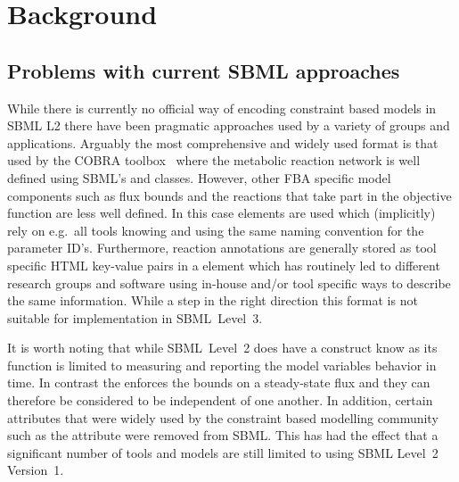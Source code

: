 
\section{Background}
\label{background}

\subsection{Problems with current SBML approaches}

While there is currently no official way of encoding constraint based models
in SBML L2 there have been pragmatic approaches used by a variety of groups
and applications. Arguably the most comprehensive and widely used format is
that used by the \textsf{COBRA toolbox}~\citep{cobra} where the metabolic
reaction network is well defined using SBML's \Reaction and \Species
classes. However, other FBA specific model components such as flux bounds
and the reactions that take part in the objective function are less well
defined. In this case \LocalParameter elements are used which (implicitly)
rely on e.g.~all tools knowing and using the same naming convention for the
parameter ID's. Furthermore, reaction annotations are generally stored as
tool specific HTML key-value pairs in a \Notes element which has routinely
led to different research groups and software using in-house and/or tool
specific ways to describe the same information. While a step in the right
direction this format is not suitable for implementation in SBML~Level~3.

It is worth noting that while SBML~Level~2 does have a construct know as
\Constraint its function is limited to measuring and reporting the model
variables behavior in time. In contrast the \FluxBound enforces the bounds
on a steady-state flux and they can therefore be considered to be
independent of one another.
%
In addition, certain attributes that were widely used by the constraint based
modelling community such as the \Species attribute  were
removed from SBML. This has had the effect that a significant number of
tools and models are still limited to using SBML Level~2 Version~1.\cite{oberhardt_2009}

